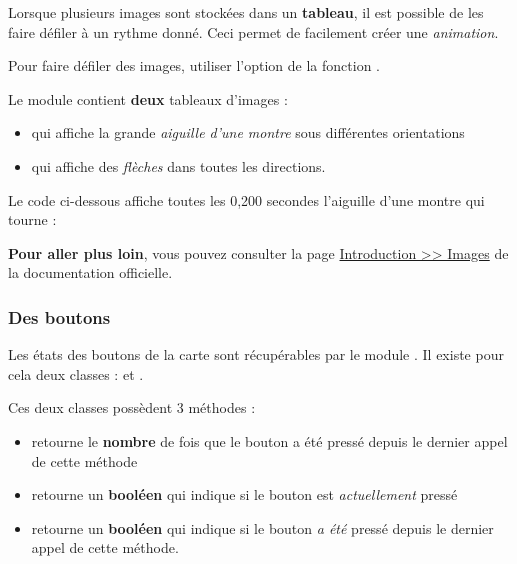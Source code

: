 Lorsque plusieurs images sont stockées dans un \textbf{tableau}, il est possible de les faire défiler à un rythme donné. Ceci permet de facilement créer une \emph{animation}. 

Pour faire défiler des images, utiliser l'option 
de la fonction .

Le module  contient \textbf{deux} tableaux d'images :
\begin{itemize}
    \item {} qui affiche la grande \emph{aiguille d'une montre} sous différentes orientations
    \item {} qui affiche des \emph{flèches} dans toutes les directions. 
\end{itemize}

\begin{methode}
Le code ci-dessous affiche toutes les 0,200 secondes l'aiguille d'une montre qui tourne :\par
{}
\end{methode}

\begin{remarque}
\textbf{Pour aller plus loin}, vous pouvez consulter la page  \href{https://microbit-micropython.readthedocs.io/fr/latest/tutorials/images.html}{Introduction >> Images} de la documentation officielle.
\end{remarque}


\subsubsection{Des boutons}

Les états des boutons de la carte \mb sont récupérables par le module . Il existe pour cela deux classes :  et .

Ces deux classes possèdent 3 méthodes :
\begin{itemize}
    \item {} retourne le \textbf{nombre} de fois que le bouton a été pressé depuis le dernier appel de cette méthode
    \item {} retourne un \textbf{booléen} qui indique si le bouton est \emph{actuellement} pressé
    \item {} retourne un \textbf{booléen} qui indique si le bouton \emph{a été} pressé depuis le dernier appel de cette méthode.
\end{itemize}

